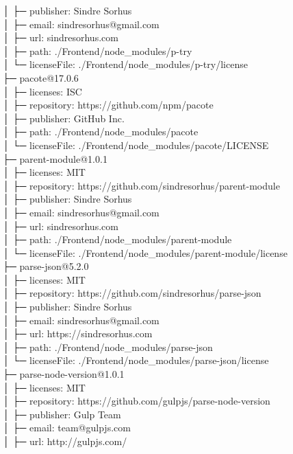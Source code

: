 │  ├─ publisher: Sindre Sorhus\\
│  ├─ email: sindresorhus@gmail.com\\
│  ├─ url: sindresorhus.com\\
│  ├─ path: ./Frontend/node\_modules/p-try\\
│  └─ licenseFile: ./Frontend/node\_modules/p-try/license\\
├─ pacote@17.0.6\\
│  ├─ licenses: ISC\\
│  ├─ repository: https://github.com/npm/pacote\\
│  ├─ publisher: GitHub Inc.\\
│  ├─ path: ./Frontend/node\_modules/pacote\\
│  └─ licenseFile: ./Frontend/node\_modules/pacote/LICENSE\\
├─ parent-module@1.0.1\\
│  ├─ licenses: MIT\\
│  ├─ repository: https://github.com/sindresorhus/parent-module\\
│  ├─ publisher: Sindre Sorhus\\
│  ├─ email: sindresorhus@gmail.com\\
│  ├─ url: sindresorhus.com\\
│  ├─ path: ./Frontend/node\_modules/parent-module\\
│  └─ licenseFile: ./Frontend/node\_modules/parent-module/license\\
├─ parse-json@5.2.0\\
│  ├─ licenses: MIT\\
│  ├─ repository: https://github.com/sindresorhus/parse-json\\
│  ├─ publisher: Sindre Sorhus\\
│  ├─ email: sindresorhus@gmail.com\\
│  ├─ url: https://sindresorhus.com\\
│  ├─ path: ./Frontend/node\_modules/parse-json\\
│  └─ licenseFile: ./Frontend/node\_modules/parse-json/license\\
├─ parse-node-version@1.0.1\\
│  ├─ licenses: MIT\\
│  ├─ repository: https://github.com/gulpjs/parse-node-version\\
│  ├─ publisher: Gulp Team\\
│  ├─ email: team@gulpjs.com\\
│  ├─ url: http://gulpjs.com/\\
